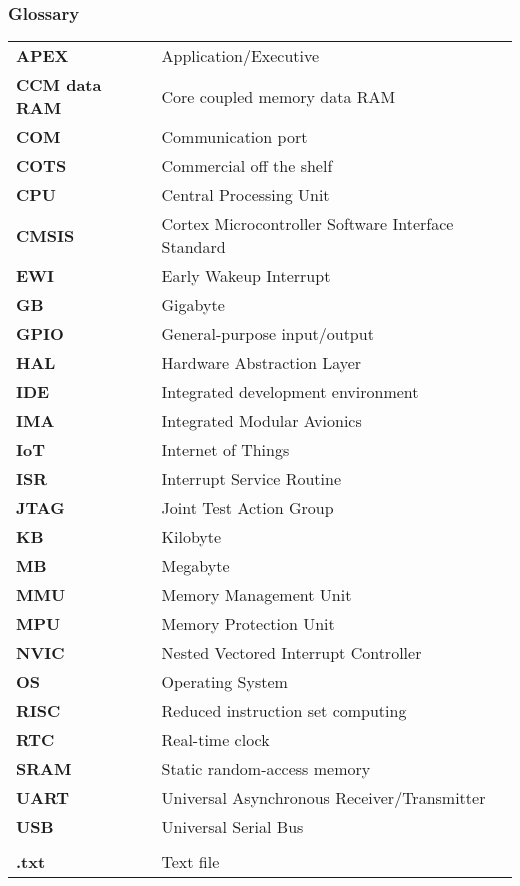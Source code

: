 \subsubsection*{Glossary}
\begin{longtable}{l p{12cm}}
\textbf{APEX}		& \qquad \qquad Application/Executive\\
\textbf{CCM data RAM}	& \qquad \qquad Core coupled memory data RAM\\
\textbf{COM}		& \qquad \qquad Communication port\\
\textbf{COTS}		& \qquad \qquad Commercial off the shelf\\
\textbf{CPU}		& \qquad \qquad Central Processing Unit\\
\textbf{CMSIS}		& \qquad \qquad Cortex Microcontroller Software Interface Standard\\
\textbf{EWI}		& \qquad \qquad Early Wakeup Interrupt\\
\textbf{GB}			& \qquad \qquad Gigabyte\\
\textbf{GPIO}		& \qquad \qquad General-purpose input/output\\
\textbf{HAL}		& \qquad \qquad Hardware Abstraction Layer\\
\textbf{IDE}		& \qquad \qquad Integrated development environment\\
\textbf{IMA}		& \qquad \qquad Integrated Modular Avionics\\
\textbf{IoT}		& \qquad \qquad Internet of Things\\
\textbf{ISR}		& \qquad \qquad Interrupt Service Routine\\
\textbf{JTAG}		& \qquad \qquad Joint Test Action Group\\
\textbf{KB}			& \qquad \qquad Kilobyte\\
\textbf{MB}			& \qquad \qquad Megabyte\\
\textbf{MMU}		& \qquad \qquad Memory Management Unit\\
\textbf{MPU}		& \qquad \qquad Memory Protection Unit\\
\textbf{NVIC}		& \qquad \qquad Nested Vectored Interrupt Controller\\
\textbf{OS}			& \qquad \qquad Operating System\\
\textbf{RISC}		& \qquad \qquad Reduced instruction set computing\\
\textbf{RTC}		& \qquad \qquad Real-time clock\\
\textbf{SRAM}		& \qquad \qquad Static random-access memory\\
\textbf{UART}		& \qquad \qquad Universal Asynchronous Receiver/Transmitter\\
\textbf{USB}		& \qquad \qquad Universal Serial Bus\\
					& \\
\textbf{.txt}		& \qquad \qquad Text file\\

\end{longtable}
